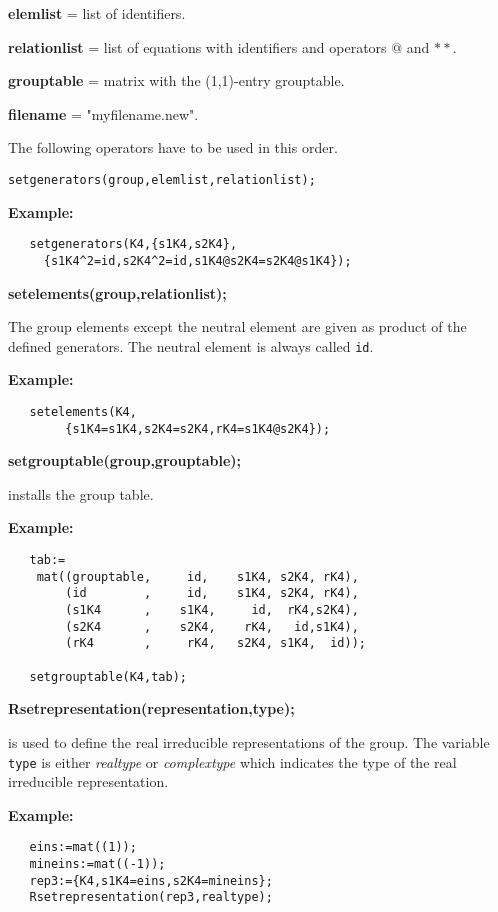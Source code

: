 {\bf elemlist} = list of identifiers.

{\bf relationlist}  = list of equations with identifiers and
operators $@$ and $**$.

{\bf grouptable} = matrix with the (1,1)-entry grouptable.

{\bf filename} = "myfilename.new".

\vspace{2cm}
The following operators have to be used in this order.

{\tt setgenerators(group,elemlist,relationlist);}

{\bf Example:}
\begin{verbatim}
   setgenerators(K4,{s1K4,s2K4},
     {s1K4^2=id,s2K4^2=id,s1K4@s2K4=s2K4@s1K4});
\end{verbatim}

{\bf setelements(group,relationlist);}

The group elements except the neutral element
are given as product of the defined
generators. The neutral element is always called {\tt id}.

{\bf Example:}
\begin{verbatim}
   setelements(K4,
        {s1K4=s1K4,s2K4=s2K4,rK4=s1K4@s2K4});
\end{verbatim}

{\bf setgrouptable(group,grouptable);}

installs the group table.

{\bf Example:}
\begin{verbatim}
   tab:=
    mat((grouptable,     id,    s1K4, s2K4, rK4),
        (id        ,     id,    s1K4, s2K4, rK4),
        (s1K4      ,    s1K4,     id,  rK4,s2K4),
        (s2K4      ,    s2K4,    rK4,   id,s1K4),
        (rK4       ,     rK4,   s2K4, s1K4,  id));

   setgrouptable(K4,tab);
\end{verbatim}

{\bf Rsetrepresentation(representation,type);}

is used to define the real irreducible representations of the group.
The variable {\tt type} is either {\em realtype} or {\em complextype}
which indicates the type of the real irreducible representation.

{\bf Example:}
\begin{verbatim}
   eins:=mat((1));
   mineins:=mat((-1));
   rep3:={K4,s1K4=eins,s2K4=mineins};
   Rsetrepresentation(rep3,realtype);
\end{verbatim}


